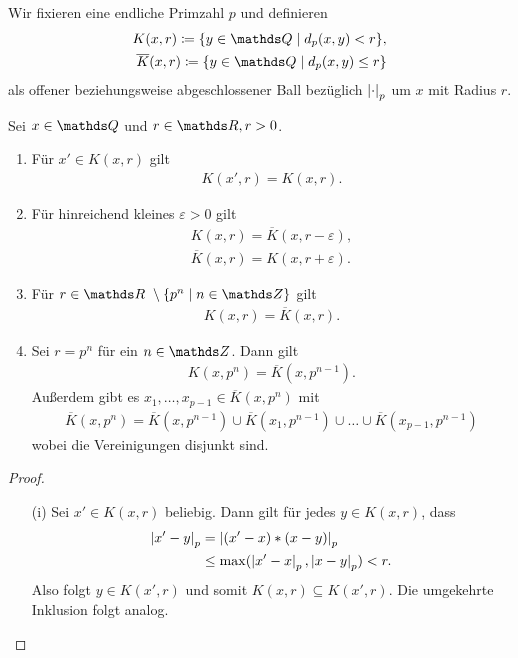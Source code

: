 \begin{defi}
Wir fixieren eine endliche Primzahl $p$ und definieren
\begin{align*}
K(x,r)\coloneqq\{y \in \Q \mid d_p(x,y)<r\},\\
\overline{K}(x,r) \coloneqq \{y\in \Q \mid d_p(x,y)\leq r\}
\end{align*}
als offener beziehungsweise abgeschlossener Ball bezüglich $\left\vert\cdot\right\vert_p$ um $x$ mit Radius $r$.
\end{defi}

\begin{satz}
Sei $x\in \Q$ und $r \in \R, r>0$.
\begin{enumerate}[label=(\roman*)]
\item Für $x'\in K(x,r)$ gilt
\begin{align*}
K(x',r)=K(x,r).
\end{align*}
\item Für hinreichend kleines $\varepsilon>0$ gilt
\begin{align*}
K(x,r)=\overline{K}(x,r-\varepsilon),\\
\overline{K}(x,r)=K(x,r+\varepsilon).
\end{align*}
\item Für $r\in \R\ \setminus \{p^n \mid n\in \Z\}$ gilt
\begin{align*}
K(x,r)=\overline{K}(x,r).
\end{align*}
\item Sei $r=p^n$ für ein $n\in \Z$. Dann gilt
\begin{align*}
K(x,p^n)=\overline{K}(x,p^{n-1}).
\end{align*}
Außerdem gibt es $x_1,\dots,x_{p-1}\in \overline{K}(x,p^n)$ mit
\begin{align*}
\overline{K}(x,p^n)=\overline{K}(x,p^{n-1})\cup \overline{K}(x_1,p^{n-1})\cup \dots \cup \overline{K}(x_{p-1},p^{n-1})
\end{align*}
wobei die Vereinigungen disjunkt sind.
\end{enumerate}
\begin{proof}
\begin{enumerate}
\item[(i)] Sei $x'\in K(x,r)$ beliebig.
Dann gilt für jedes $y\in K(x,r)$, dass 
\begin{align*}
\left\vert x'-y\right\vert_p&=\left\vert(x'-x)*(x-y)\right\vert_p\\
&\leq \max(\left\vert x'-x\right\vert_p,\left\vert x-y\right\vert_p)<r.
\end{align*}
Also folgt $y\in K(x',r)$ und somit $K(x,r)\subseteq K(x',r)$.
Die umgekehrte Inklusion folgt analog.

\end{enumerate}
\end{proof}
\end{satz}
